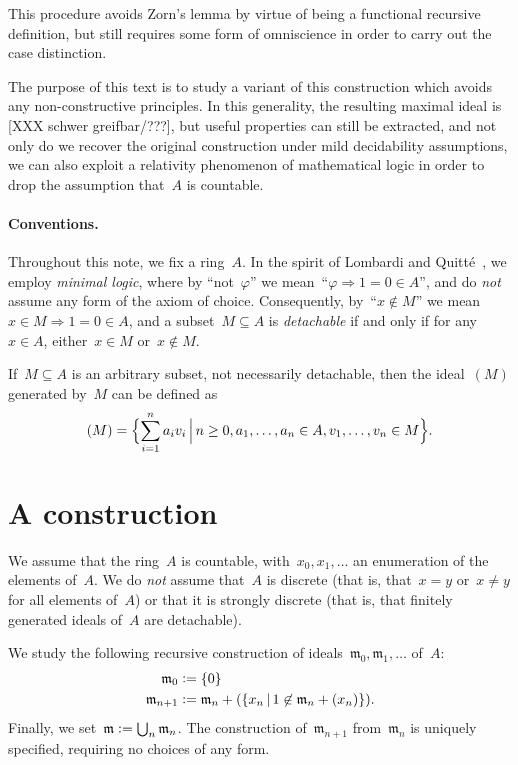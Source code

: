 \documentclass[envcountsect,envcountsame,runningheads]{llncs}
\newcommand{\mmm}{\mathfrak{m}}
\newcommand{\defeq}{\vcentcolon=}
\renewcommand{\_}{\mathpunct{.}\,}
\begin{document}
This procedure avoids Zorn's lemma by virtue of being a
functional recursive definition, but still requires some form of omniscience in
order to carry out the case distinction.

The purpose of this text is to study a variant of this construction which
avoids any non-constructive principles. In this generality, the resulting
maximal ideal is [XXX schwer greifbar/???], but useful properties can still be
extracted, and not only do we recover the original construction under mild
decidability assumptions, we can also exploit a relativity phenomenon of
mathematical logic in order to drop the assumption that~$A$ is countable.

\paragraph{Conventions.} Throughout this note, we fix a ring~$A$.
In the spirit of Lombardi and Quitté~\cite{lombardi-quitte:constructive-algebra}, we employ \emph{minimal
logic}, where by ``not~$\varphi$'' we mean~``$\varphi \Rightarrow 1 = 0 \in A$'', and do \emph{not} assume any form of the axiom of choice. Consequently,
by~``$x \not\in M$'' we mean~$x \in M \Rightarrow 1 = 0 \in A$, and a subset~$M
\subseteq A$ is \emph{detachable} if and only if for any~$x \in A$, either~$x \in M$
or~$x \not\in M$.

If~$M \subseteq A$ is an arbitrary subset, not necessarily
detachable, then the ideal~$(M)$ generated by~$M$ can be defined
as \[ (M) = \Bigl\{ \sum_{i=1}^n a_i v_i \,\Big|\, n \geq 0, a_1,\ldots,a_n \in
A, v_1,\ldots,v_n \in M \Bigr\}. \]


\section{A construction}
\label{sect:constr}

We assume that the ring~$A$ is countable, with~$x_0, x_1, \ldots$ an
enumeration of the elements of~$A$. We do \emph{not} assume that~$A$ is
discrete (that is, that~$x = y$ or~$x \neq y$ for all elements of~$A$) or that
it is strongly discrete (that is, that finitely generated
ideals of~$A$ are detachable).

We study the following recursive construction of ideals~$\mmm_0, \mmm_1,
\ldots$ of~$A$:
\begin{align*}
  \mmm_0 &\defeq \{0\} \\
  \mmm_{n+1} &\defeq \mmm_n + (\{ x_n \,|\, 1 \not\in \mmm_n + (x_n) \}).
\end{align*}
Finally, we set~$\mmm \defeq \bigcup_n \mmm_n$. The construction
of~$\mmm_{n+1}$ from~$\mmm_n$ is uniquely specified, requiring no choices of
any form.
\end{document}
